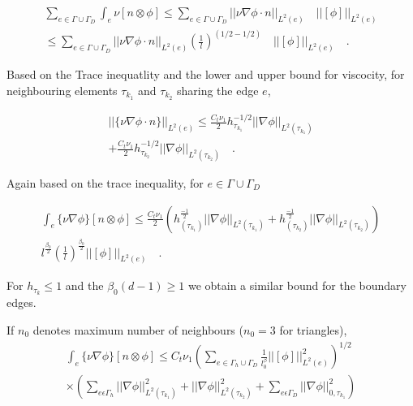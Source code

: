 \documentclass[a4paper]{book}
\begin{document}
\begin{equation}
\begin{split}
\sum_{e \in \Gamma \cup \Gamma_D} \int_e {\nu}[n \otimes \phi] \leq \sum_{e \in \Gamma \cup \Gamma_D} ||\nu \nabla \phi \cdot n||_{L^2(e)} \quad ||[\phi]||_{L^2(e)} \\ \leq \sum_{e \in \Gamma \cup \Gamma_D} ||\nu \nabla \phi \cdot n||_{L^2(e)} (\frac{1}{l})^{(1/2-1/2)} \quad ||[\phi]||_{L^2(e)} \quad \textrm{.}
\end{split}
\end{equation}

Based on the Trace inequatlity and the lower and upper bound for viscocity, for neighbouring elements $\tau_{k_1}$ and $\tau_{k_2}$ sharing the edge $e$, 

\begin{equation}
\begin{split}
||\lbrace \nu \nabla \phi \cdot n \rbrace||_{L^2(e)} \leq \frac{C_t \nu_1}{2} {h_{\tau_{k_1}}^{-1/2}} ||\nabla \phi||_{L^2({\tau_{k_1}})} \\ + \frac{C_t \nu_1}{2} {h_{{\tau_{k_2}}}^{-1/2}} ||\nabla \phi||_{L^2({\tau_{k_2}})} \quad \textrm{.}
\end{split}
\end{equation}

Again based on the trace inequality, for $e \in \Gamma \cup \Gamma_D$

\begin{equation}
\begin{split}
\int_e \lbrace \nu \nabla \phi \rbrace [n \otimes \phi] \leq \frac{C_t \nu_1}{2}  \left( h_{(\tau_{k_1})}^{\frac{-1}{2}} ||\nabla \phi||_{L^2{(\tau_{k_1})}} + {h_{(\tau_{k_2})}^{\frac{-1}{2}}} ||\nabla \phi||_{L^2{(\tau_{k_2})}} \right) \\ l^{\frac{\beta_0}{2}} \left({\frac{1}{l}}\right)^{\frac{\beta_0}{2}} ||[\phi]||_{L^2(e)} \quad \textrm{.}
\end{split}
\end{equation}

For $h_{\tau_k} \leq 1$ and the $\beta_0 (d-1) \geq 1$ we obtain a similar bound for the boundary edges.

If $n_0$ denotes maximum number of neighbours ($n_0 = 3$ for triangles),
\begin{equation}
\begin{split}
\int_e \lbrace \nu \nabla \phi \rbrace[n \otimes \phi] \leq C_t \nu_1 \left( \sum_{e \in \Gamma_h \cup \Gamma_D} \frac{1}{l^\beta_0} ||[\phi]||^2_{L^2(e)} \right)^{1/2} \\ \times \left( \sum_{e \epsilon \Gamma_h} ||\nabla \phi||^2_{L^2(\tau_{k_1})} + ||\nabla \phi||^2_{L^2(\tau_{k_2})} + \sum_{e \epsilon \Gamma_D} ||\nabla \phi||^2_{0,\tau_{k_1}} \right)
\end{split}
\end{equation}
\end{document}
